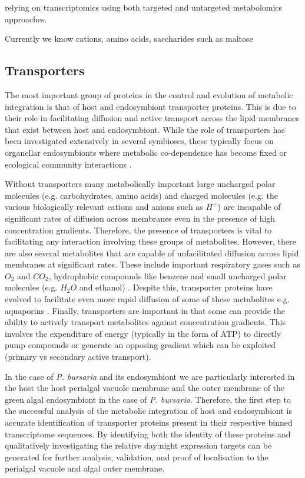 {{relying on transcriptomics using both
targeted and untargeted metabolomics approaches. 


Currently we know cations, amino acids, saccharides such as maltose


\subsection{Transporters}
The most important group of proteins in the control and evolution
of metabolic integration is that of host and endosymbiont transporter proteins.
This is due to their role in facilitating diffusion and active transport
across the lipid membranes that exist between host and endosymbiont.
While the role of transporters has been investigated extensively in 
several symbioses, these typically focus on organellar endosymbionts where
metabolic co-dependence has become fixed \citep{Yuan1994,Tyra2007,Huang2007,Li2010a} 
or ecological community interactions 
\citep{Richards2013,Hirner2006,Bachmann2013,Oldroyd2009}.


Without transporters many metabolically important 
large uncharged polar molecules (e.g. carbohydrates, amino acids)
and charged molecules (e.g. the various biologically relevant cations and anions such
as \(H^{+}\)) are incapable of significant rates of diffusion 
across membranes even in the presence of high concentration gradients. 
Therefore, the presence of transporters is vital to facilitating
any interaction involving these groups of metabolites. 
However, there are also several metabolites that are capable 
of unfacilitated diffusion across lipid membranes at significant rates.
These include important respiratory gases such as \(O_{2}\) and \(CO_2\),
hydrophobic compounds like benzene and small uncharged polar molecules
(e.g. \(H_2O\) and ethanol) \citep{cooper2013the,alberts2015molecular}.  
Despite this, transporter proteins have evolved to facilitate
even more rapid diffusion of some of these metabolites e.g. aquaporins
\citep{Agre1993}.  
Finally, transporters are important in that some can provide the ability
to actively transport metabolites against concentration gradients. 
This involves the expenditure of energy (typically in the form of ATP)
to directly pump compounds or generate an opposing gradient which can be
exploited (primary vs secondary active transport).


In the case of \textit{P. bursaria} and its endosymbiont we are
particularly interested in the host 
the host perialgal vacuole membrane and the outer membrane of the green
algal endosymbiont in the case of \textit{P. bursaria}.  
Therefore, the first step to the successful analysis of the metabolic
integration of host and endosymbiont is accurate identification of
transporter proteins present in their respective binned transcriptome
sequences.   By identifying both the identity of these proteins 
and qualitatively investigating the relative day:night expression
targets can be generated for further analysis, validation, and 
proof of localisation to the perialgal vacuole and algal outer
membrane.


}}
